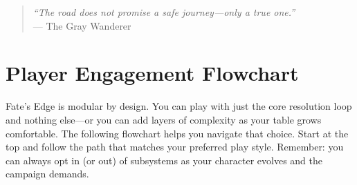 \vspace{1em}
\begin{quote}
\textit{``The road does not promise a safe journey---only a true one.''} \\
--- The Gray Wanderer
\end{quote}

\section{Player Engagement Flowchart}

Fate's Edge is modular by design. You can play with just the core resolution loop and nothing else---or you can add layers of complexity as your table grows comfortable. The following flowchart helps you navigate that choice. Start at the top and follow the path that matches your preferred play style. Remember: you can always opt in (or out) of subsystems as your character evolves and the campaign demands.

